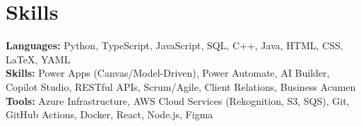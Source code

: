 \documentclass[11pt]{article}       %
\begin{document}

\vspace{-18.5pt}

\section*{Skills}
\textbf{Languages:} Python, TypeScript, JavaScript, SQL, C++, Java, HTML, CSS, LaTeX, YAML\\
\textbf{Skills:} Power Apps (Canvas/Model-Driven), Power Automate, AI Builder, Copilot Studio, RESTful APIs, Scrum/Agile, Client Relations, Business Acumen\\
\textbf{Tools:} Azure Infrastructure, AWS Cloud Services (Rekognition, S3, SQS), Git, GitHub Actions, Docker, React, Node.js, Figma\\

\vspace{-6.5pt}
\end{document}
